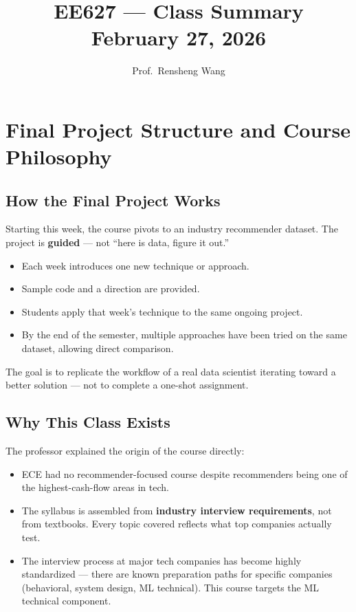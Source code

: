 \documentclass[11pt]{article}
\title{\textbf{EE627 --- Class Summary}\\[0.4em]
       \large February 27, 2026}
\author{Prof.\ Rensheng Wang}
\date{}
\begin{document}
\maketitle
\tableofcontents
\newpage

\section{Final Project Structure and Course Philosophy}

\subsection{How the Final Project Works}
Starting this week, the course pivots to an industry recommender dataset.
The project is \textbf{guided} --- not ``here is data, figure it out.''
\begin{itemize}
    \item Each week introduces one new technique or approach.
    \item Sample code and a direction are provided.
    \item Students apply that week's technique to the same ongoing project.
    \item By the end of the semester, multiple approaches have been tried
      on the same dataset, allowing direct comparison.
\end{itemize}
The goal is to replicate the workflow of a real data scientist iterating
toward a better solution --- not to complete a one-shot assignment.

\subsection{Why This Class Exists}
The professor explained the origin of the course directly:
\begin{itemize}
    \item ECE had no recommender-focused course despite recommenders being
      one of the highest-cash-flow areas in tech.
    \item The syllabus is assembled from \textbf{industry interview
      requirements}, not from textbooks. Every topic covered reflects
      what top companies actually test.
    \item The interview process at major tech companies has become highly
      standardized --- there are known preparation paths for specific
      companies (behavioral, system design, ML technical). This course
      targets the ML technical component.
\end{itemize}
\end{document}
